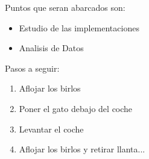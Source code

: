 \documentclass{book}
\begin{document}
Puntos que seran abarcados son:
\begin{itemize}
\item Estudio de las implementaciones
\item Analisis de Datos
\end{itemize}
Pasos a seguir:
\begin{enumerate}
\item Aflojar los birlos
\item Poner el gato debajo del coche
\item Levantar el coche
\item Aflojar los birlos y retirar llanta...
\end{enumerate}
\end{document}

